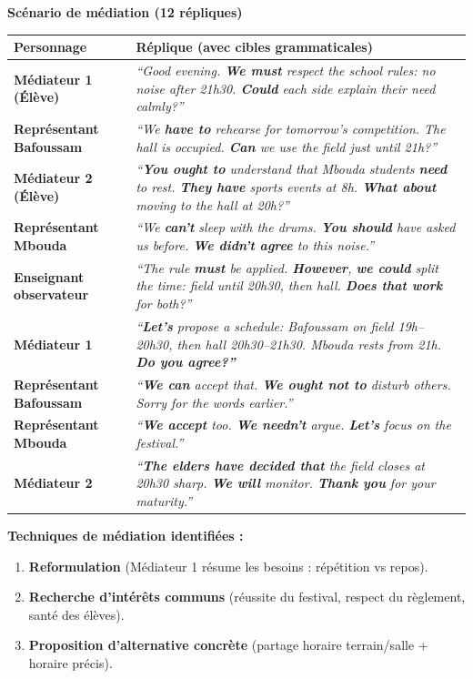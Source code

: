 \documentclass[11pt]{article}
\begin{document}
\begin{corrige}
\textbf{Scénario de médiation (12 répliques)}

\begin{center}
\begin{tabularx}{\linewidth}{|l|X|}\hline
\textbf{Personnage} & \textbf{Réplique (avec cibles grammaticales)} \\ \hline
\textbf{Médiateur 1 (Élève)} & \emph{``Good evening. \textbf{We must} respect the school rules: no noise after 21h30. \textbf{Could} each side explain their need calmly?''} \\ \hline
\textbf{Représentant Bafoussam} & \emph{``We \textbf{have to} rehearse for tomorrow's competition. The hall is occupied. \textbf{Can} we use the field just until 21h?''} \\ \hline
\textbf{Médiateur 2 (Élève)} & \emph{``\textbf{You ought to} understand that Mbouda students \textbf{need} to rest. \textbf{They have} sports events at 8h. \textbf{What about} moving to the hall at 20h?''} \\ \hline
\textbf{Représentant Mbouda} & \emph{``We \textbf{can't} sleep with the drums. \textbf{You should} have asked us before. \textbf{We didn't agree} to this noise.''} \\ \hline
\textbf{Enseignant observateur} & \emph{``The rule \textbf{must} be applied. \textbf{However}, \textbf{we could} split the time: field until 20h30, then hall. \textbf{Does that work} for both?''} \\ \hline
\textbf{Médiateur 1} & \emph{``\textbf{Let's} propose a schedule: Bafoussam on field 19h--20h30, then hall 20h30--21h30. Mbouda rests from 21h. \textbf{Do you agree?''} } \\ \hline
\textbf{Représentant Bafoussam} & \emph{``\textbf{We can} accept that. \textbf{We ought not to} disturb others. Sorry for the words earlier.''} \\ \hline
\textbf{Représentant Mbouda} & \emph{``\textbf{We accept} too. \textbf{We needn't} argue. \textbf{Let's} focus on the festival.''} \\ \hline
\textbf{Médiateur 2} & \emph{``\textbf{The elders have decided that} the field closes at 20h30 sharp. \textbf{We will} monitor. \textbf{Thank you} for your maturity.''} \\ \hline
\end{tabularx}
\end{center}

\textbf{Techniques de médiation identifiées :}
\begin{enumerate}
    \item \textbf{Reformulation} (Médiateur 1 résume les besoins : répétition vs repos).
    \item \textbf{Recherche d'intérêts communs} (réussite du festival, respect du règlement, santé des élèves).
    \item \textbf{Proposition d'alternative concrète} (partage horaire terrain/salle + horaire précis).
\end{enumerate}
\end{corrige}
\end{document}
